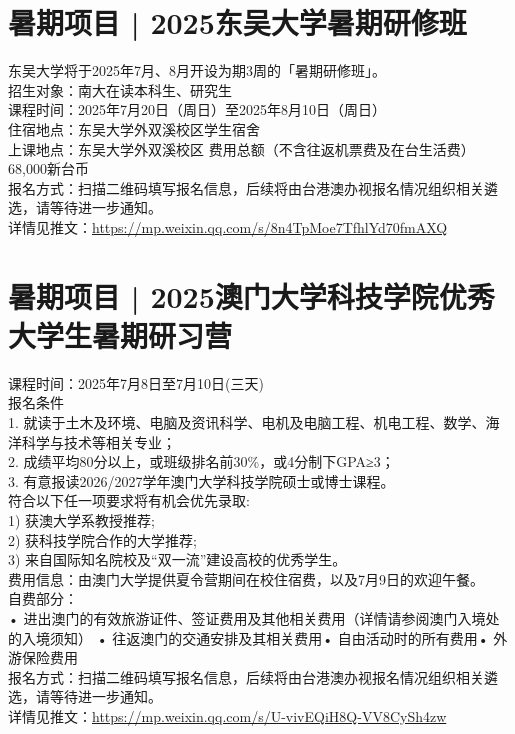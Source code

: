\documentclass[letterpaper, 12pt]{article}
\begin{document}
\begin{multicols}{2}
\section{暑期项目 | 2025东吴大学暑期研修班}
东吴大学将于2025年7月、8月开设为期3周的「暑期研修班」。\\
招生对象：南大在读本科生、研究生\\
课程时间：2025年7月20日（周日）至2025年8月10日（周日）\\
住宿地点：东吴大学外双溪校区学生宿舍\\
上课地点：东吴大学外双溪校区 费用总额（不含往返机票费及在台生活费）68,000新台币\\
报名方式：扫描二维码填写报名信息，后续将由台港澳办视报名情况组织相关遴选，请等待进一步通知。\\
详情见推文：\url{https://mp.weixin.qq.com/s/8n4TpMoe7TfhlYd70fmAXQ}

\section{暑期项目 | 2025澳门大学科技学院优秀大学生暑期研习营}
课程时间：2025年7月8日至7月10日(三天)\\
报名条件\\
1. 就读于土木及环境、电脑及资讯科学、电机及电脑工程、机电工程、数学、海洋科学与技术等相关专业；\\
2. 成绩平均80分以上，或班级排名前30\%，或4分制下GPA≥3；\\
3. 有意报读2026/2027学年澳门大学科技学院硕士或博士课程。\\
符合以下任一项要求将有机会优先录取:\\
1) 获澳大学系教授推荐;\\
2) 获科技学院合作的大学推荐;\\
3) 来自国际知名院校及“双一流”建设高校的优秀学生。\\
费用信息：由澳门大学提供夏令营期间在校住宿费，以及7月9日的欢迎午餐。\\
自费部分：\\
• 进出澳门的有效旅游证件、签证费用及其他相关费用（详情请参阅澳门入境处的入境须知）
• 往返澳门的交通安排及其相关费用• 自由活动时的所有费用• 外游保险费用\\
报名方式：扫描二维码填写报名信息，后续将由台港澳办视报名情况组织相关遴选，请等待进一步通知。\\
详情见推文：\url{https://mp.weixin.qq.com/s/U-vivEQiH8Q-VV8CySh4zw}




\end{multicols} 
\end{document}
